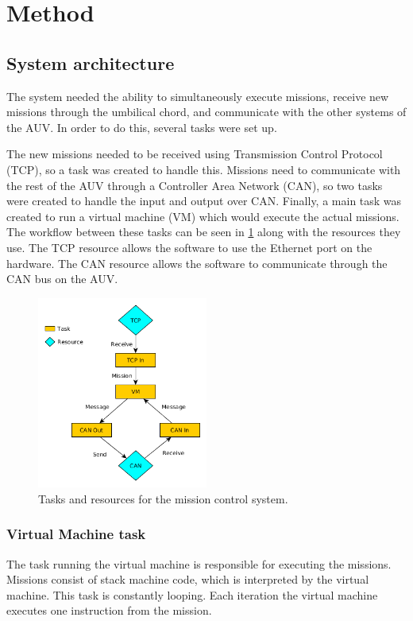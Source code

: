 \section{Method}\label{sec:method}
\newline
\subsection{System architecture}
The system needed the ability to simultaneously execute missions, receive new missions through the umbilical chord, and communicate with the other systems of the AUV. In order to do this, several tasks were set up.


The new missions needed to be received using Transmission Control Protocol (TCP), so a task was created to handle this. Missions need to communicate with the rest of the AUV through a Controller Area Network (CAN), so two tasks were created to handle the input and output over CAN. Finally, a main task was created to run a virtual machine (VM) which would execute the actual missions. The workflow between these tasks can be seen in \cref{fig:data_flow_figure} along with the resources they use. The TCP resource allows the software to use the Ethernet port on the hardware. The CAN resource allows the software to communicate through the CAN bus on the AUV.

\pageref{fig:data_flow_figure}
\begin{figure}[h]
    \includegraphics[width=0.5\textwidth]{./figure/figureTasksAndResources.png}
    \caption{Tasks and resources for the mission control system.}
    \label{fig:data_flow_figure}
\end{figure}

\subsubsection{Virtual Machine task}
The task running the virtual machine is responsible for executing the missions. Missions consist of stack machine code, which is interpreted by the virtual machine. This task is constantly looping. Each iteration the virtual machine executes one instruction from the mission.

